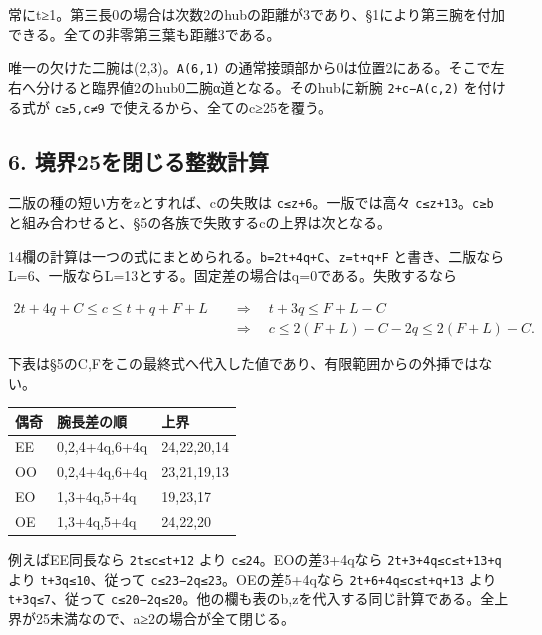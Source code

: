 \documentclass[
  10pt,
  a4paper,
]{article}
\let\originaltexttt\texttt
\renewcommand{\texttt}[1]{\leavevmode\allowbreak\mbox{\originaltexttt{#1}}}
\begin{document}
常にt≥1。第三長0の場合は次数2のhubの距離が3であり、§1により第三腕を付加できる。全ての非零第三葉も距離3である。

唯一の欠けた二腕は(2,3)。\texttt{A(6,1)}
の通常接頭部から0は位置2にある。そこで左右へ分けると臨界値2のhub0二腕α道となる。そのhubに新腕
\texttt{2+c−A(c,2)} を付ける式が \texttt{c≥5,c≠9}
で使えるから、全てのc≥25を覆う。

\subsection{6.
境界25を閉じる整数計算}\label{ux5883ux754c25ux3092ux9589ux3058ux308bux6574ux6570ux8a08ux7b97}

二版の種の短い方をzとすれば、cの失敗は \texttt{c≤z+6}。一版では高々
\texttt{c≤z+13}。\texttt{c≥b}
と組み合わせると、§5の各族で失敗するcの上界は次となる。

14欄の計算は一つの式にまとめられる。\texttt{b=2t+4q+C}、\texttt{z=t+q+F}
と書き、二版ならL=6、一版ならL=13とする。固定差の場合はq=0である。失敗するなら

\[
\begin{aligned}
2t+4q+C\le c\le t+q+F+L
&\quad\Longrightarrow\quad t+3q\le F+L-C\\
&\quad\Longrightarrow\quad c\le2(F+L)-C-2q\le2(F+L)-C.
\end{aligned}
\]

下表は§5のC,Fをこの最終式へ代入した値であり、有限範囲からの外挿ではない。

\begin{center}
\begin{tabular}{@{}lll@{}}
\toprule\noalign{}
偶奇 & 腕長差の順 & 上界 \\
\midrule\noalign{}
EE & 0,2,4+4q,6+4q & 24,22,20,14 \\
OO & 0,2,4+4q,6+4q & 23,21,19,13 \\
EO & 1,3+4q,5+4q & 19,23,17 \\
OE & 1,3+4q,5+4q & 24,22,20 \\
\bottomrule
\end{tabular}
\end{center}

例えばEE同長なら \texttt{2t≤c≤t+12} より \texttt{c≤24}。EOの差3+4qなら
\texttt{2t+3+4q≤c≤t+13+q} より \texttt{t+3q≤10}、従って
\texttt{c≤23−2q≤23}。OEの差5+4qなら \texttt{2t+6+4q≤c≤t+q+13} より
\texttt{t+3q≤7}、従って
\texttt{c≤20−2q≤20}。他の欄も表のb,zを代入する同じ計算である。全上界が25未満なので、a≥2の場合が全て閉じる。

\Needspace{90pt}
\end{document}
